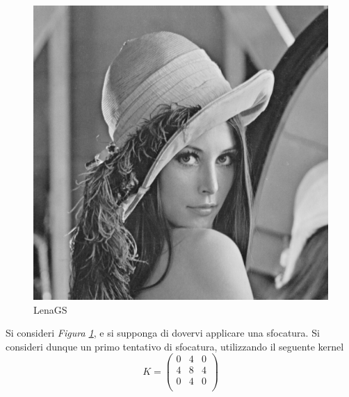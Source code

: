 \documentclass{subfiles}
\begin{document}
\begin{figure}
    \centering
    \includegraphics[scale = 0.25]{../Images/LenaGS.png}
    \caption{LenaGS}
    \label{fig:4.1}
\end{figure}
\noindent Si consideri \emph{Figura \ref{fig:4.1}}, e si supponga di dovervi applicare una sfocatura.
Si consideri dunque un primo tentativo di sfocatura, utilizzando il seguente kernel
\[K = \begin{pmatrix}
        0 & 4 & 0 \\
        4 & 8 & 4 \\
        0 & 4 & 0 \\
    \end{pmatrix}\]
\end{document}
